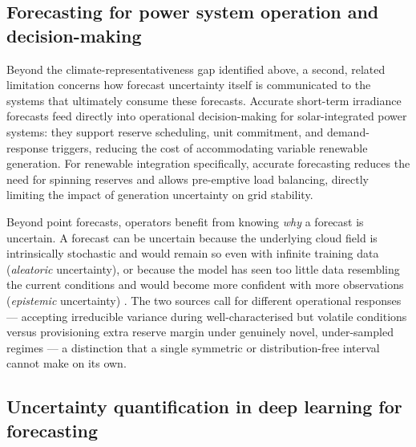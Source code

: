 \subsection{Forecasting for power system operation and decision-making}

Beyond the climate-representativeness gap identified above, a second,
related limitation concerns how forecast uncertainty itself is communicated
to the systems that ultimately consume these forecasts. Accurate short-term
irradiance forecasts feed directly into operational
decision-making for solar-integrated power systems: they support reserve
scheduling, unit commitment, and demand-response triggers, reducing the cost
of accommodating variable renewable generation. For
renewable integration specifically, accurate forecasting reduces the need for
spinning reserves and allows pre-emptive load balancing, directly limiting the
impact of generation uncertainty on grid stability.

Beyond point forecasts, operators benefit from knowing \emph{why} a forecast
is uncertain. A forecast can be uncertain because the underlying cloud field
is intrinsically stochastic and would remain so even with infinite training
data (\emph{aleatoric} uncertainty), or because the model has seen too little
data resembling the current conditions and would become more confident with
more observations (\emph{epistemic} uncertainty) \cite{kendall2017}. The two
sources call for different operational responses --- accepting irreducible
variance during well-characterised but volatile conditions versus
provisioning extra reserve margin under genuinely novel, under-sampled
regimes --- a distinction that a single symmetric or distribution-free
interval cannot make on its own.

\subsection{Uncertainty quantification in deep learning for forecasting}

